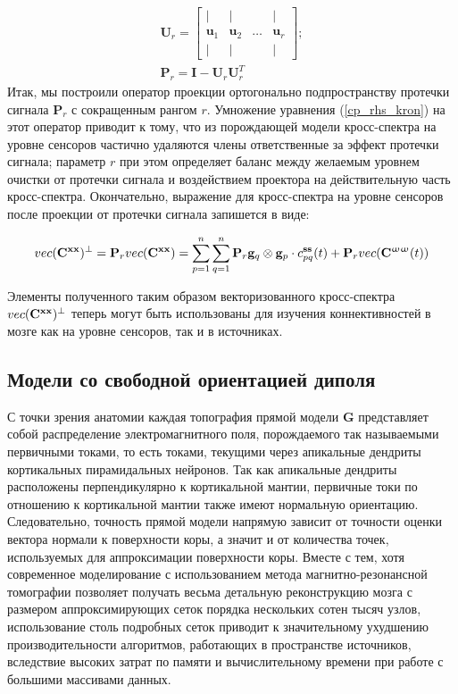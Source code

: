 \begin{gather}
    \mathbf{U}_r = 
    \begin{bmatrix}
        |            & |            &        & |       \\
        \mathbf{u}_1 & \mathbf{u}_2 & \dots  & \mathbf{u}_r \\
        |            & |            &        & |
    \end{bmatrix};\\
    \mathbf{P}_r = \mathbf{I} - \mathbf{U}_r \mathbf{U}_r^T
 \end{gather} 
Итак, мы построили оператор проекции ортогонально подпространству протечки сигнала $\mathbf{P}_r$
с сокращенным рангом $r$.
Умножение уравнения (\ref{cp_rhs_kron}) на этот оператор приводит к тому, что  из порождающей
модели кросс-спектра на уровне сенсоров частично удаляются члены ответственные за эффект протечки сигнала;
параметр $r$ при этом определяет баланс между желаемым уровнем очистки от протечки сигнала и
воздействием проектора на действительную часть кросс-спектра.
Окончательно, выражение для кросс-спектра на уровне сенсоров после проекции от протечки сигнала
запишется в виде:

\begin{equation}    
    vec(\mathbf{C}^{\mathbf{x x}})^\perp = \mathbf{P}_r vec(\mathbf{C}^{\mathbf{x x}}) =  \sum\limits_{p=1}^n\sum\limits_{q=1}^n \mathbf{P}_r \mathbf{g}_q\otimes \mathbf{g}_p \cdot c_{pq}^{\mathbf{ss}}(t) + \mathbf{P}_r vec(\mathbf{C}^{\mathbf{\upomega \upomega}}(t))
    \label{cp_final}
\end{equation}  

Элементы полученного таким образом векторизованного кросс-спектра $vec(\mathbf{C}^{\mathbf{x x}})^\perp$ теперь могут быть использованы для изучения коннективностей в мозге как на уровне сенсоров, так и в источниках.

\subsection{Модели со свободной ориентацией диполя}
С точки зрения анатомии каждая топография прямой модели $\mathbf{G}$
представляет собой распределение электромагнитного поля,
порождаемого так называемыми первичными токами, то есть токами,
текущими через апикальные дендриты кортикальных пирамидальных нейронов.
Так как апикальные дендриты расположены перпендикулярно к кортикальной мантии,
первичные токи по отношению к кортикальной мантии также имеют нормальную ориентацию.
Следовательно, точность прямой модели напрямую зависит от точности оценки вектора нормали
к поверхности коры, а значит и от количества точек, используемых для аппроксимации поверхности коры.
Вместе с тем, хотя современное моделирование с использованием метода магнитно-резонансной
томографии позволяет получать весьма детальную реконструкцию мозга с размером аппроксимирующих сеток 
порядка нескольких сотен тысяч узлов, использование столь подробных сеток приводит к значительному
ухудшению производительности алгоритмов, работающих в пространстве источников, вследствие высоких затрат
по памяти и вычислительному времени при работе с большими массивами данных.

